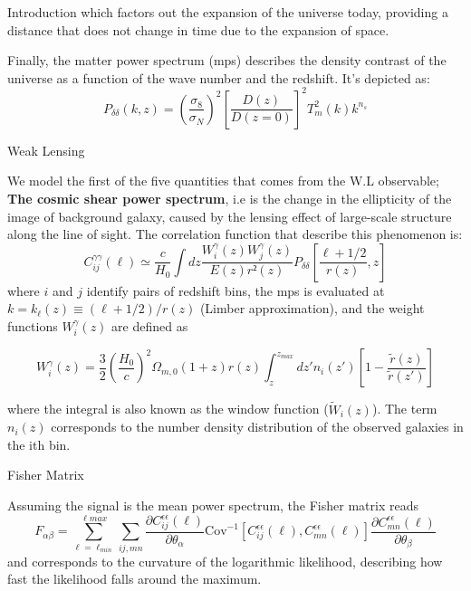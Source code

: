 \begin{frame}[t]
\begin{columns}[t]
\begin{column}{.465\textwidth}
\begin{block}{Introduction}
which factors out the expansion of the universe today, providing a distance that does not change in time due to the expansion of space.

Finally, the matter power spectrum (mps) describes the density contrast of the universe as a function of the wave number and the redshift. It's depicted as: 
$$P_{\delta \delta}(k,z) = \left(\frac{\sigma _8}{\sigma _N}\right)^2\left[\frac{D(z)}{D(z=0)}\right]^2 T_m^2(k)k^{n_s}$$





\end{block}

\begin{block}{Weak Lensing}


We model the first of the five quantities that comes from the W.L observable; \textbf{The cosmic shear power spectrum}, i.e is the change in the ellipticity of the image of background galaxy, caused by the lensing effect of large-scale structure along the line of sight. The correlation function that describe this phenomenon is:
$$C_{ij}^{\gamma\gamma}(\ell)\simeq \frac{c}{H_0}\int dz\frac{W_i^\gamma(z)W_j^\gamma(z)}{E(z)r²(z)}P_{\delta\delta}\left[\frac{\ell + 1/2}{r(z)},z\right]$$ where $i$ and $j$ identify pairs of redshift bins, the mps is evaluated at $k=k_\ell(z)\equiv(\ell+1/2)/r(z)$ (Limber approximation), and the weight functions $W_i^\gamma(z)$ are defined as 


$$W_i^\gamma(z) = \frac{3}{2}\left(\frac{H_0}{c}\right)^2\Omega_{m,0}(1+z)r(z)
\int_z^{z_{max}}dz'n_i(z')\left[1-\frac{\tilde{r}(z)}{\tilde{r}(z')}\right]$$ 

where the integral is also known as the window function ($\tilde{W}_i(z)$). The term $n_i(z)$ corresponds to the number density distribution of the observed galaxies in the ith bin. %

    
\end{block}
\begin{block}{Fisher Matrix}

Assuming the signal is the mean power spectrum, the Fisher matrix reads
$$F_{\alpha\beta}=\sum_{\ell=\ell_{min}}^{\ell{max}}\sum_{ij,mn}\frac{\partial C_{ij}^{\epsilon\epsilon}(\ell)}{\partial \theta_\alpha}\text{Cov}^{-1}[C_{ij}^{\epsilon\epsilon}(\ell), C_{mn}^{\epsilon\epsilon}(\ell)]
\frac{\partial C_{mn}^{\epsilon\epsilon}(\ell)}{\partial \theta_\beta}$$ 
and corresponds to the curvature of the logarithmic likelihood, describing how fast the likelihood falls around the maximum.
\end{block}
\end{column}



\end{columns}
\end{frame}

